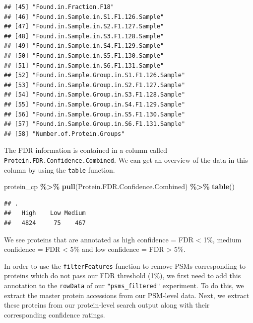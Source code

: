 \documentclass[9pt,a4paper,]{extarticle}
\newenvironment{Shaded}{\begin{snugshade}}{\end{snugshade}}
\newcommand{\FunctionTok}[1]{\textcolor[rgb]{0.13,0.29,0.53}{\textbf{#1}}}
\newcommand{\NormalTok}[1]{#1}
\newcommand{\SpecialCharTok}[1]{\textcolor[rgb]{0.81,0.36,0.00}{\textbf{#1}}}
\begin{document}
\begin{verbatim}
## [45] "Found.in.Fraction.F18"                          
## [46] "Found.in.Sample.in.S1.F1.126.Sample"            
## [47] "Found.in.Sample.in.S2.F1.127.Sample"            
## [48] "Found.in.Sample.in.S3.F1.128.Sample"            
## [49] "Found.in.Sample.in.S4.F1.129.Sample"            
## [50] "Found.in.Sample.in.S5.F1.130.Sample"            
## [51] "Found.in.Sample.in.S6.F1.131.Sample"            
## [52] "Found.in.Sample.Group.in.S1.F1.126.Sample"      
## [53] "Found.in.Sample.Group.in.S2.F1.127.Sample"      
## [54] "Found.in.Sample.Group.in.S3.F1.128.Sample"      
## [55] "Found.in.Sample.Group.in.S4.F1.129.Sample"      
## [56] "Found.in.Sample.Group.in.S5.F1.130.Sample"      
## [57] "Found.in.Sample.Group.in.S6.F1.131.Sample"      
## [58] "Number.of.Protein.Groups"
\end{verbatim}

The FDR information is contained in a column called \texttt{Protein.FDR.Confidence.Combined}.
We can get an overview of the data in this column by using the \texttt{table} function.

\begin{Shaded}
\begin{Highlighting}[]
\NormalTok{protein\_cp }\SpecialCharTok{\%\textgreater{}\%}
  \FunctionTok{pull}\NormalTok{(Protein.FDR.Confidence.Combined) }\SpecialCharTok{\%\textgreater{}\%}
  \FunctionTok{table}\NormalTok{()}
\end{Highlighting}
\end{Shaded}

\begin{verbatim}
## .
##   High    Low Medium 
##   4824     75    467
\end{verbatim}

We see proteins that are annotated as high confidence = FDR \textless{} 1\%, medium
confidence = FDR \textless{} 5\% and low confidence = FDR \textgreater{} 5\%.

In order to use the \texttt{filterFeatures} function to remove PSMs corresponding to
proteins which do not pass our FDR threshold (1\%), we first need to add this
annotation to the \texttt{rowData} of our \texttt{"psms\_filtered"} experiment. To do this, we
extract the master protein accessions from our PSM-level data. Next, we
extract these proteins from our protein-level search output along with their
corresponding confidence ratings.
\end{document}

